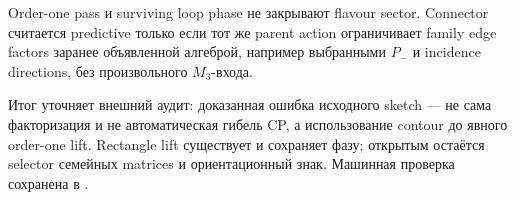 \begin{nogocriterion}
Order-one pass и surviving loop phase не закрывают flavour sector. Connector
считается predictive только если тот же parent action ограничивает family
edge factors заранее объявленной алгеброй, например выбранными
\(P_-\) и incidence directions, без произвольного \(M_3\)-входа.
\end{nogocriterion}

Итог уточняет внешний аудит: доказанная ошибка исходного sketch --- не сама
факторизация и не автоматическая гибель CP, а использование contour до
явного order-one lift. Rectangle lift существует и сохраняет фазу; открытым
остаётся selector семейных matrices и ориентационный знак. Машинная проверка
сохранена в
.